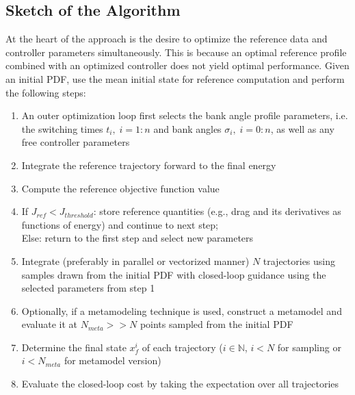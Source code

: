 \documentclass[10pt,a4paper]{article}
\begin{document}
	\subsection{Sketch of the Algorithm}
	At the heart of the approach is the desire to optimize the reference data and controller parameters simultaneously. This is because an optimal reference profile combined with an optimized controller does not yield optimal performance. Given an initial PDF, use the mean initial state for reference computation and perform the following steps:
	\begin{enumerate}
		\item An outer optimization loop first selects the bank angle profile parameters, i.e. the switching times $t_i,\;i=1:n$ and bank angles $\sigma_i,\;i=0:n$, as well as any free controller parameters
		\item Integrate the reference trajectory forward to the final energy
		\item Compute the reference objective function value
		\item If $ J_{ref} < J_{threshold} $: store reference quantities (e.g., drag and its derivatives as functions of energy) and continue to next step;\\
		Else: return to the first step and select new parameters
		\item Integrate (preferably in parallel or vectorized manner) $ N $ trajectories using samples drawn from the initial PDF with closed-loop guidance using the selected parameters from step 1
		\item Optionally, if a metamodeling technique is used, construct a metamodel and evaluate it at $N_{meta}>> N$ points sampled from the initial PDF
		\item Determine the final state $x^i_{f}$ of each trajectory ($i\in \mathbb{N}$, $i<N$ for sampling or $i < N_{meta}$ for metamodel version)
		\item Evaluate the closed-loop cost by taking the expectation over all trajectories
	\end{enumerate}
		
\end{document}
